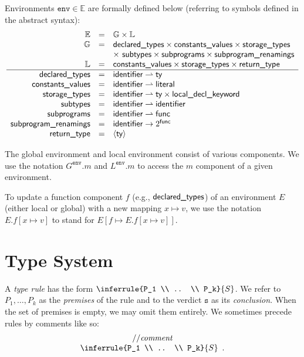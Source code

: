\documentclass{book}
\newcommand\RuleComment[1]{// \textit{#1}}
\newcommand\tenv[0]{\texttt{env}}
\newcommand\vs[0]{\texttt{s}}
\begin{document}
Environments $\tenv \in \mathbb{E}$ are formally defined below (referring to symbols defined in the abstract syntax):
\[
\begin{array}{rcl}
\mathbb{E} 	            &=& \mathbb{G} \times \mathbb{L}\\
\mathbb{G} 	            &=& \textsf{declared\_types} \times \textsf{constants\_values} \times \textsf{storage\_types}\\
  			                & & \times\ \textsf{subtypes} \times \textsf{subprograms} \times \textsf{subprogram\_renamings}\\
\mathbb{L} 	            &=& \textsf{constants\_values} \times \textsf{storage\_types} \times \textsf{return\_type}\\
\hline
\textsf{declared\_types}	        &=& \textsf{identifier} \rightharpoonup \textsf{ty}\\
\textsf{constants\_values}        &=& \textsf{identifier} \rightharpoonup \textsf{literal}\\
\textsf{storage\_types}           &=& \textsf{identifier} \rightharpoonup \textsf{ty} \times \textsf{local\_decl\_keyword}\\
\textsf{subtypes}		            &=& \textsf{identifier} \rightharpoonup \textsf{identifier}\\
\textsf{subprograms}	          &=& \textsf{identifier} \rightharpoonup \textsf{func}\\
\textsf{subprogram\_renamings}	  &=& \textsf{identifier} \rightarrow 2^{\textsf{func}}\\
\textsf{return\_type}             &=& \langle \textsf{ty} \rangle
\end{array}
\]

The global environment and local environment consist of various components. 
We use the notation $G^\tenv.m$ and $L^\tenv.m$ to access the $m$ component of a given environment.

To update a function component $f$ (e.g., $\textsf{declared\_types}$) of an environment $E$ (either local or global)
with a new mapping $x \mapsto v$, we use the notation $E.f[x \mapsto v]$ to stand for $E[f \mapsto E.f[x \mapsto v]]$.

\section{Type System}
A \emph{type rule} has the form $\inferrule{P_1 \\ .. \\ P_k}{S}$. 
We refer to $P_1,\ldots,P_k$ as the \emph{premises} of the rule and to the verdict $\vs$ as its \emph{conclusion}.
When the set of premises is empty, we may omit them entirely.
%
We sometimes precede rules by comments like so:
\[
\begin{array}{c}
\RuleComment{comment}\\
\inferrule{P_1 \\ .. \\ P_k}{S} \enspace.
\end{array} 
\]
\end{document}
